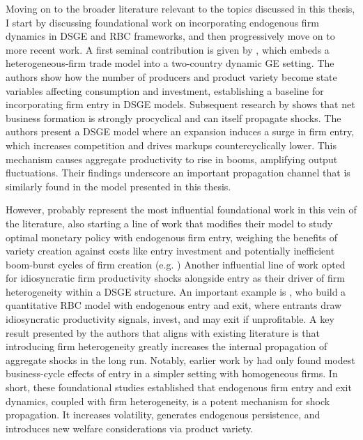 \documentclass[a4paper,12pt]{article} %
\numberwithin{equation}{section} %
\numberwithin{figure}{section}
\numberwithin{table}{section}
\begin{document}
Moving on to the broader literature relevant to the topics discussed in this thesis, I start by discussing foundational work on 
incorporating endogenous firm dynamics in DSGE and RBC frameworks, and then progressively move on to more recent work. 
A first seminal contribution is given by \textcite{ghironi2007trade}, which embeds a heterogeneous-firm trade model into
a two-country dynamic GE setting. The authors show how the number of producers and product variety become state variables
affecting consumption and investment, establishing a baseline for incorporating firm entry in DSGE models. 
Subsequent research by \textcite{jaimovich2008firm} shows that net business formation is strongly procyclical 
and can itself propagate shocks. The authors present a DSGE model where an expansion induces a surge in firm entry, 
which increases competition and drives markups countercyclically lower. This mechanism causes aggregate productivity to 
rise in booms, amplifying output fluctuations. Their findings underscore an important propagation channel 
that is similarly found in the model presented in this thesis.

However, \textcite{bilbiie2012endogenous} probably represent the most influential foundational work in this vein of the literature, 
also starting a line of work that modifies their model to study optimal monetary policy with endogenous firm entry, weighing the benefits 
of variety creation against costs like entry investment and potentially inefficient boom-burst cycles of firm creation (e.g. \cite{bilbiie2014optimal, lewis2012firm})
Another influential line of work opted for idiosyncratic firm productivity shocks alongside entry as their driver of firm heterogeneity within a DSGE structure. 
An important example is \textcite{clementi2016entry}, who build a quantitative RBC model with endogenous entry and exit, where entrants draw idiosyncratic 
productivity signals, invest, and may exit if unprofitable. A key result presented by the authors that aligns with existing literature is that introducing 
firm heterogeneity greatly increases the internal propagation of aggregate shocks in the long run. Notably, earlier work by \textcite{samaniego2008entry} had 
only found modest business-cycle effects of entry in a simpler setting with homogeneous firms. In short, these foundational studies established that 
endogenous firm entry and exit dynamics, coupled with firm heterogeneity, is a potent mechanism for shock propagation. It increases volatility, 
generates endogenous persistence, and introduces new welfare considerations via product variety.
\end{document}
